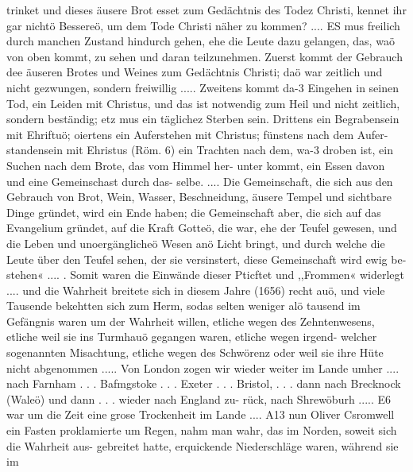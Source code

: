 trinket und dieses äusere Brot esset zum Gedächtnis des Todez
Christi, kennet ihr gar nichtö Bessereö, um dem Tode Christi näher
zu kommen? ....
ES mus freilich durch manchen Zustand hindurch gehen, ehe
die Leute dazu gelangen, das, waö von oben kommt, zu sehen
und daran teilzunehmen. Zuerst kommt der Gebrauch dee äuseren
Brotes und Weines zum Gedächtnis Christi; daö war zeitlich und
nicht gezwungen, sondern freiwillig ..... Zweitens kommt da-3
Eingehen in seinen Tod, ein Leiden mit Christus, und das ist
notwendig zum Heil und nicht zeitlich, sondern beständig; etz mus
ein täglichez Sterben sein. Drittens ein Begrabensein mit Ehriftuö;
oiertens ein Auferstehen mit Christus; fünstens nach dem Aufer-
standensein mit Ehristus (Röm. 6) ein Trachten nach dem, wa-3
droben ist, ein Suchen nach dem Brote, das vom Himmel her-
unter kommt, ein Essen davon und eine Gemeinschast durch das-
selbe. .... Die Gemeinschaft, die sich aus den Gebrauch von
Brot, Wein, Wasser, Beschneidung, äusere Tempel und sichtbare
Dinge gründet, wird ein Ende haben; die Gemeinschaft aber, die
sich auf das Evangelium gründet, auf die Kraft Gotteö, die war,
ehe der Teufel gewesen, und die Leben und unoergänglicheö Wesen
anö Licht bringt, und durch welche die Leute über den Teufel
sehen, der sie versinstert, diese Gemeinschaft wird ewig be-
stehen« .... .
Somit waren die Einwände dieser Pticftet und ,,Frommen«
widerlegt .... und die Wahrheit breitete sich in diesem Jahre
(1656) recht auö, und viele Tausende bekehtten sich zum Herm,
sodas selten weniger alö tausend im Gefängnis waren um der
Wahrheit willen, etliche wegen des Zehntenwesens, etliche
weil sie ins Turmhauö gegangen waren, etliche wegen irgend-
welcher sogenannten Misachtung, etliche wegen des Schwörenz
oder weil sie ihre Hüte nicht abgenommen .....
Von London zogen wir wieder weiter im Lande umher ....
nach Farnham . . . Bafmgstoke . . . Exeter . . . Bristol, . . . dann
nach Brecknock (Waleö) und dann . . . wieder nach England zu-
rück, nach Shrewöburh .....
E6 war um die Zeit eine grose Trockenheit im Lande ....
A13 nun Oliver Csromwell ein Fasten proklamierte um Regen,
nahm man wahr, das im Norden, soweit sich die Wahrheit aus-
gebreitet hatte, erquickende Niederschläge waren, während sie im


